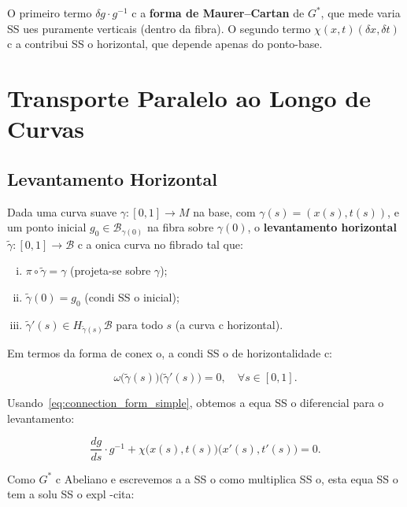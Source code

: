 {O primeiro termo $\delta g \cdot g^{-1}$ c a \textbf{forma de
Maurer--Cartan} de $G^*$, que mede varia SS ues puramente verticais
(dentro da fibra). O segundo termo $\chi(x,t)(\delta x, \delta t)$ c a
contribui SS o horizontal, que depende apenas do ponto-base.

\section{Transporte Paralelo ao Longo de Curvas}

\subsection{Levantamento Horizontal}

Dada uma curva suave $\gamma: [0,1] \to M$ na base, com
$\gamma(s) = (x(s), t(s))$, e um ponto inicial $g_0 \in
\mathcal{B}_{\gamma(0)}$ na fibra sobre $\gamma(0)$, o
\textbf{levantamento horizontal} $\tilde{\gamma}: [0,1] \to
\mathcal{B}$ c a onica curva no fibrado tal que:

\begin{enumerate}[(i)]
 \item $\pi \circ \tilde{\gamma} = \gamma$ (projeta-se sobre $\gamma$);
 \item $\tilde{\gamma}(0) = g_0$ (condi SS o inicial);
 \item $\tilde{\gamma}'(s) \in H_{\tilde{\gamma}(s)}\mathcal{B}$ para
 todo $s$ (a curva c horizontal).
\end{enumerate}

Em termos da forma de conex o, a condi SS o de horizontalidade c:

\begin{equation}\label{eq:horizontality_condition}
 \omega\big(\tilde{\gamma}(s)\big)\big(\tilde{\gamma}'(s)\big) = 0,
 \quad \forall s \in [0,1].
\end{equation}

Usando~\eqref{eq:connection_form_simple}, obtemos a equa SS o diferencial
para o levantamento:

\begin{equation}\label{eq:horizontal_lift_ode}
 \frac{dg}{ds} \cdot g^{-1} + \chi\big(x(s), t(s)\big)\big(x'(s), t'(s)\big) = 0.
\end{equation}

Como $G^*$ c Abeliano e escrevemos a a SS o como multiplica SS o, esta
equa SS o tem a solu SS o expl -cita:

}
